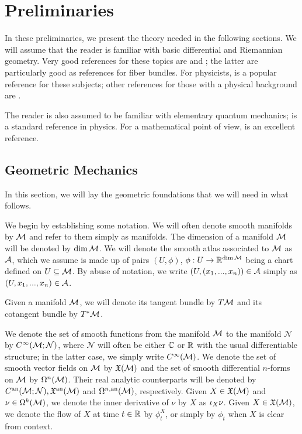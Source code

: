 \documentclass[notas.tex]{subfiles}
\begin{document}
\chapter{Preliminaries} \label{sec_prelim}

In these preliminaries, we present the theory needed in the following sections. We will assume that the reader is familiar with basic differential and Riemannian geometry. Very good references for these topics are \cite{godinho_introduction_2014, boothby_introduction_1986,do_carmo_riemannian_1992} and \cite{kobayashi_foundations_1963, kobayashi_differential_1987}; the latter are particularly good as references for fiber bundles. For physicists, \cite{nakahara_geometry_2003} is a popular reference for these subjects; other references for those with a physical background are \cite{isham_modern_1999, nash_topology_1983}. 

The reader is also assumed to be familiar with elementary quantum mechanics; \cite{griffiths_introduction_2018} is a standard reference in physics. For a mathematical point of view, \cite{hall_quantum_2013} is an excellent reference.

\section{Geometric Mechanics} \label{sec_gm}

In this section, we will lay the geometric foundations that we will need in what follows.

We begin by establishing some notation. We will often denote smooth manifolds by $\mathcal{M}$ and refer to them simply as manifolds. The dimension of a manifold $\mathcal{M}$ will be denoted by $\dim \mathcal{M}$. We will denote the smooth atlas associated to $\mathcal{M}$ as $\mathcal{A}$, which we assume is made up of pairs $(U, \phi)$, $\phi: U \to \mathbb{R}^{\dim \mathcal{M}}$ being a chart defined on $U \subseteq \mathcal{M}$. By abuse of notation, we write $(U, (x_1,..., x_n)) \in \mathcal{A}$ simply as $(U, x_1,..., x_n) \in \mathcal{A}$.

Given a manifold $\mathcal{M}$, we will denote its tangent bundle by $T\mathcal{M}$ and its cotangent bundle by $T^*\mathcal{M}$.

We denote the set of smooth functions from the manifold $\mathcal{M}$ to the manifold $\mathcal{N}$ by $C^\infty(\mathcal{M}; \mathcal{N})$, where $\mathcal{N}$ will often be either $\mathbb{C}$ or $\mathbb{R}$ with the usual differentiable structure; in the latter case, we simply write $C^\infty(\mathcal{M})$. We denote the set of smooth vector fields on $\mathcal{M}$ by $\mathfrak{X}(\mathcal{M})$ and
the set of smooth differential $n$-forms on $\mathcal{M}$ by $\Omega^n(\mathcal{M})$. Their real analytic counterparts will be denoted by $C^{\text{an}}(\mathcal{M}; \mathcal{N}), \mathfrak{X}^{\text{an}}(\mathcal{M})$ and $\Omega^{n,\text{an}}(\mathcal{M})$, respectively. Given $X \in \mathfrak{X}(\mathcal{M})$ and $\nu \in \Omega^{k}(\mathcal{M})$, we denote the inner derivative of $\nu$ by $X$ as $\iota_{X}\nu$. Given $X \in \mathfrak{X}(\mathcal{M})$, we denote the flow of $X$ at time $t \in \mathbb{R}$ by $\phi^X_t$, or simply by $\phi_t$ when $X$ is clear from context.
\end{document}
